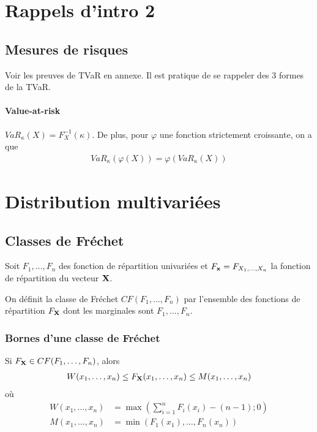 \documentclass[10pt, french]{article}
\begin{document}
\begin{multicols*}{2} 

\section{Rappels d'intro 2}
\subsection{Mesures de risques}
Voir les preuves de TVaR en annexe. Il est pratique de se rappeler des 3 formes de la TVaR.

\paragraph{Value-at-risk}
$VaR_{\kappa}(X) = F_{X}^{-1}(\kappa)$. De plus, pour $\varphi$ une fonction strictement croissante, on a que
\begin{align*}
VaR_{\kappa}(\varphi(X)) = \varphi \left ( VaR_{\kappa}(X) \right )
\end{align*}



\section{Distribution multivariées}
\subsection{Classes de Fréchet}
Soit $F_1, \dots, F_n$ des fonction de répartition univariées et $F_{\mathbf{x}} = F_{X_1, \dots, X_n}$ la fonction de répartition du vecteur $\mathbf{X}$.

On définit la classe de Fréchet $CF(F_1, \dots, F_n)$ par l'ensemble des fonctions de répartition $F_{\mathbf{X}}$ dont les marginales sont $F_1, \dots, F_n$.

\subsubsection{Bornes d'une classe de Fréchet}
Si $F_{\mathbf{X}} \in CF(F_1, \dots, F_n)$, alors
\begin{align*}
W(x_1, \dots, x_n) \leq F_{\mathbf{X}}(x_1, \dots, x_n) \leq M(x_1, \dots, x_n)
\end{align*}
où
\begin{align*}
W(x_1, \dots, x_n)	& = \max \left (\sum_{i=1}^{n} F_i(x_i) - (n-1) ; 0 \right ) \\
M(x_1, \dots, x_n)	& = \min \left ( F_1(x_1), \dots, F_n(x_n) \right) \\
\end{align*}


\end{multicols*}
\end{document}
